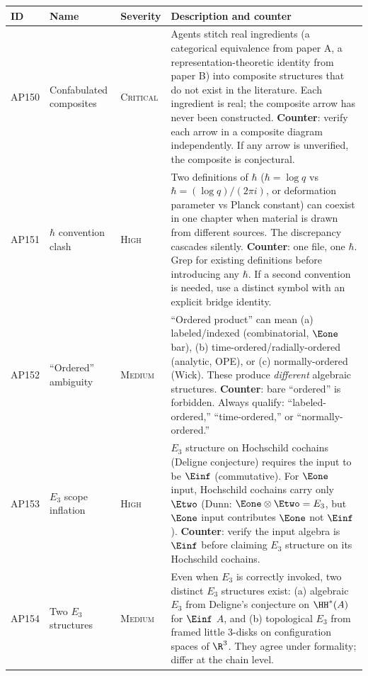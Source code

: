 {%
\small
\begin{longtable}{@{}p{1.6cm}p{2.4cm}lp{7.4cm}@{}}
\toprule
\textbf{ID} & \textbf{Name} & \textbf{Severity}
  & \textbf{Description and counter} \\
\midrule
\endhead
AP150 & Confabulated composites & \textsc{Critical} &
  Agents stitch real ingredients (a categorical equivalence
  from paper A, a representation-theoretic identity from
  paper B) into composite structures that do not exist in
  the literature.  Each ingredient is real; the composite
  arrow has never been constructed.
  \textbf{Counter}: verify each arrow in a composite diagram
  independently.  If any arrow is unverified, the composite
  is conjectural. \\
\midrule
AP151 & $\hbar$ convention clash & \textsc{High} &
  Two definitions of $\hbar$ ($\hbar = \log q$ vs
  $\hbar = (\log q)/(2\pi i)$, or deformation parameter vs
  Planck constant) can coexist in one chapter when material
  is drawn from different sources.  The discrepancy cascades
  silently.
  \textbf{Counter}: one file, one $\hbar$.  Grep for
  existing definitions before introducing any $\hbar$.
  If a second convention is needed, use a distinct symbol
  with an explicit bridge identity. \\
\midrule
AP152 & ``Ordered'' ambiguity & \textsc{Medium} &
  ``Ordered product'' can mean
  (a) labeled/indexed (combinatorial, $\Eone$ bar),
  (b) time-ordered/radially-ordered (analytic, OPE), or
  (c) normally-ordered (Wick).
  These produce \emph{different} algebraic structures.
  \textbf{Counter}: bare ``ordered'' is forbidden.
  Always qualify: ``labeled-ordered,'' ``time-ordered,''
  or ``normally-ordered.'' \\
\midrule
AP153 & $E_3$ scope inflation & \textsc{High} &
  $E_3$ structure on Hochschild cochains (Deligne conjecture)
  requires the input to be $\Einf$ (commutative).  For
  $\Eone$ input, Hochschild cochains carry only $\Etwo$
  (Dunn: $\Eone \otimes \Etwo = E_3$, but $\Eone$ input
  contributes $\Eone$ not $\Einf$).
  \textbf{Counter}: verify the input algebra is $\Einf$
  before claiming $E_3$ structure on its Hochschild
  cochains. \\
\midrule
AP154 & Two $E_3$ structures & \textsc{Medium} &
  Even when $E_3$ is correctly invoked, two distinct $E_3$
  structures exist:
  (a) algebraic $E_3$ from Deligne's conjecture on
  $\HH^*(A)$ for $\Einf$ $A$, and
  (b) topological $E_3$ from framed little 3-disks on
  configuration spaces of $\R^3$.
  They agree under formality; differ at the chain level.

\end{longtable}}
